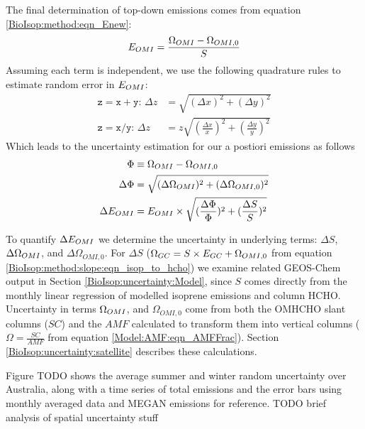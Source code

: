     The final determination of top-down emissions comes from equation \ref{BioIsop:method:eqn_Enew}: 
    \begin{equation*}
      E_{OMI}=\frac{\Omega_{OMI} - \Omega_{OMI,0}}{S}
    \end{equation*}
    Assuming each term is independent, we use the following quadrature rules to estimate random error in $E_{OMI}$:
    \begin{align}
      \mathtt{z=x+y:} \, \Delta{z} & = \sqrt{(\Delta{x})^2 + (\Delta{y})^2} \\
      \mathtt{z=x/y:} \, \Delta{z} & = z \sqrt{(\frac{\Delta{x}}{x})^2 + (\frac{\Delta{y}}{y})^2} \label{BioIsop:uncertainty:eqn_quadrature_divide} 
    \end{align}
    Which leads to the uncertainty estimation for our a postiori emissions as follows
    \begin{align}
      \Phi & \equiv \Omega_{OMI} - \Omega_{OMI,0}   \notag \\
      \Delta{\Phi} & = \sqrt{(\Delta{\Omega_{OMI}})^2 + (\Delta{\Omega_{OMI,0}})^2}  \label{BioIsop:uncertainty:eomi:eqn_delta_Phi} \\
      \Delta{E_{OMI}} &= E_{OMI} \times \sqrt{(\frac{\Delta{\Phi}}{\Phi})^2 + (\frac{\Delta{S}}{S})^2} \label{BioIsop:uncertainty:eomi:eqn_delta_apost}
    \end{align}
    
    To quantify $\Delta{E_{OMI}}$ we determine the uncertainty in underlying terms: $\Delta{S}$, $\Delta{\Omega_{OMI}}$, and $\Delta{\Omega_{OMI,0}}$. 
    For $\Delta{S}$ ($\Omega_{GC} = S \times E_{GC} + \Omega_{OMI,0}$ from equation \ref{BioIsop:method:slope:eqn_isop_to_hcho}) we examine related GEOS-Chem output in Section \ref{BioIsop:uncertainty:Model}, since $S$ comes directly from the monthly linear regression of modelled isoprene emissions and column HCHO.
    Uncertainty in terms $\Omega_{OMI}$, and $\Omega_{OMI,0}$ come from both the OMHCHO slant columns ($SC$) and the $AMF$ calculated to transform them into vertical columns ($\Omega = \frac{SC}{AMF}$ from equation \ref{Model:AMF:eqn_AMFFrac}).
    Section \ref{BioIsop:uncertainty:satellite} describes these calculations.
    
    
    Figure TODO shows the average summer and winter random uncertainty over Australia, along with a time series of total emissions and the error bars using monthly averaged data and MEGAN emissions for reference.
    TODO brief analysis of spatial uncertainty stuff
    
